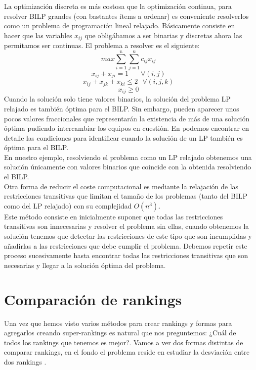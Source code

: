 La optimización discreta es más costosa que la optimización continua, para resolver BILP grandes (con bastantes ítems a ordenar) es conveniente resolverlos como un problema de programación lineal relajado. Básicamente consiste en hacer que las variables $x_{ij}$ que obligábamos a ser binarias y discretas ahora las permitamos ser continuas. El problema a resolver es el siguiente:
\begin{equation} \label{optprob2}
	max \sum_{i=1}^{n} \sum_{j=1}^{n} c_{ij} x_{ij}
\end{equation}
\begin{equation*}
	x_{ij} + x_{ji} = 1 \ \ \ \ \ \ \ \ \forall (i,j)
\end{equation*}
\begin{equation*}
	x_{ij} + x_{jk} + x_{ki} \leq 2 \ \ \ \forall (i,j,k)
\end{equation*}
\begin{equation*}
	x_{ij} \geq 0
\end{equation*}
Cuando la solución solo tiene valores binarios, la solución del problema LP relajado es también óptima para el BILP. Sin embargo, pueden aparecer unos pocos valores fraccionales que representarán la existencia de más de una solución óptima pudiendo intercambiar los equipos en cuestión. En \cite{refbilp} podemos encontrar en detalle las condiciones para identificar cuando la solución de un LP también es óptima para el BILP.\\
En nuestro ejemplo, resolviendo el problema como un LP relajado obtenemos una solución únicamente con valores binarios que coincide con la obtenida resolviendo el BILP. \\

Otra forma de reducir el coste computacional es mediante la relajación de las restricciones transitivas que limitan el tamaño de los problemas (tanto del BILP como del LP relajado) con su complejidad $O(n^{3})$. \\
Este método consiste en inicialmente suponer que todas las restricciones transitivas son innecesarias y resolver el problema sin ellas, cuando obtenemos la solución tenemos que detectar las restricciones de este tipo que son incumplidas y añadirlas a las restricciones que debe cumplir el problema. Debemos repetir este proceso sucesivamente hasta encontrar todas las restricciones transitivas que son necesarias y llegar a la solución óptima del problema.\\


\section{Comparación de rankings}
Una vez que hemos visto varios métodos para crear rankings y formas para agregarlos creando super-rankings es natural que nos preguntemos: ¿Cuál de todos los rankings que tenemos es mejor?. Vamos a ver dos formas distintas de comparar rankings, en el fondo el problema reside en estudiar la desviación entre dos rankings \cite{cap16}.

